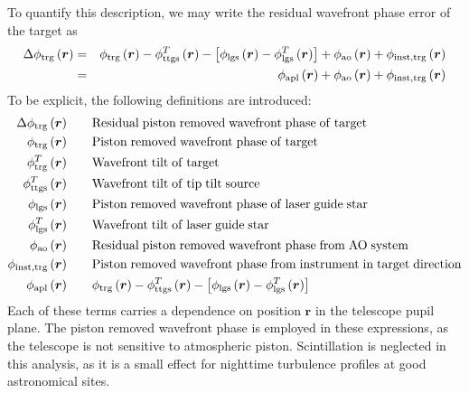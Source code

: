 To quantify this description, we may write the residual wavefront
phase error of the target as
\begin{eqnarray}\label{phdiff}
\Delta\phi_{\rm trg}\left(\boldsymbol{r}\right) & = & \phi_{\rm trg}\left(\boldsymbol{r}\right) - \phi^{T}_{\rm ttgs}\left(\boldsymbol{r}\right) - 
\left[\phi_{\rm lgs}\left(\boldsymbol{r}\right) - \phi^{T}_{\rm lgs}\left(\boldsymbol{r}\right)\right] + \phi_{\rm ao}\left(\boldsymbol{r}\right) + 
\phi_{\rm inst,trg}\left(\boldsymbol{r}\right) \\
& = & \phi_{\rm apl}\left(\boldsymbol{r}\right) + \phi_{\rm ao}\left(\boldsymbol{r}\right)  + \phi_{\rm inst,trg}\left(\boldsymbol{r}\right) \nonumber
\end{eqnarray}
To be explicit, the following definitions are introduced:
\begin{equation}\label{phidefs}
\begin{aligned}
\Delta\phi_{\rm trg}\left(\boldsymbol{r}\right)  \quad & \quad  {\rm Residual\;piston\;removed\;wavefront\;phase\;of\;target} \\
\phi_{\rm trg}\left(\boldsymbol{r}\right)  \quad & \quad  {\rm Piston\;removed\;wavefront\;phase\;of\;target}  \\
\phi^{T}_{\rm trg}\left(\boldsymbol{r}\right)  \quad & \quad  {\rm Wavefront\;tilt\;of\;target}  \\
\phi^{T}_{\rm ttgs}\left(\boldsymbol{r}\right)  \quad & \quad  {\rm Wavefront\;tilt\;of\;tip\;tilt\;source}  \\
\phi_{\rm lgs}\left(\boldsymbol{r}\right)  \quad & \quad  {\rm Piston\;removed\;wavefront\;phase\;of\;laser\;guide\;star}  \\
\phi^{T}_{\rm lgs}\left(\boldsymbol{r}\right)  \quad & \quad  {\rm Wavefront\;tilt\;of\;laser\;guide\;star}  \\
\phi_{\rm ao}\left(\boldsymbol{r}\right)  \quad & \quad  {\rm Residual\;piston\;removed\;wavefront\;phase\;from\;AO\;system}  \\
\phi_{\rm inst,trg}\left(\boldsymbol{r}\right)  \quad & \quad  {\rm Piston\;removed\;wavefront\;phase\;from\;instrument\;in\;target\;direction}  \\
\phi_{\rm apl}\left(\boldsymbol{r}\right)  \quad & \quad  \phi_{\rm trg}\left(\boldsymbol{r}\right) - \phi^{T}_{\rm ttgs}\left(\boldsymbol{r}\right) - 
\left[\phi_{\rm lgs}\left(\boldsymbol{r}\right) - \phi^{T}_{\rm lgs}\left(\boldsymbol{r}\right)\right]
\end{aligned}
\end{equation}
Each of these terms carries a dependence on position $\boldsymbol{r}$
in the telescope pupil plane.  The piston removed wavefront phase is
employed in these expressions, as the telescope is not sensitive to
atmospheric piston.  Scintillation is neglected in this analysis, as
it is a small effect for nighttime turbulence profiles at good
astronomical sites.

